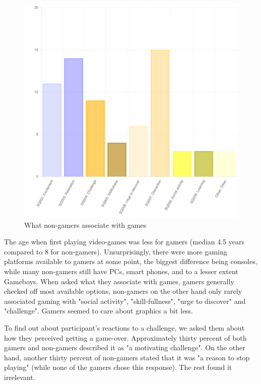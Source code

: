 \documentclass[]{vutinfth}
\begin{document}
\begin{figure}
\centering
\includegraphics{images/non-gamer-interests.png}
\caption{What non-gamers associate with games}
\end{figure}

The age when first playing video-games was less for gamers (median 4.5
years compared to 8 for non-gamers). Unsurprisingly, there were more
gaming platforms available to gamers at some point, the biggest
difference being consoles, while many non-gamers still have PCs, smart
phones, and to a lesser extent Gameboys. When asked what they associate
with games, gamers generally checked off most available options,
non-gamers on the other hand only rarely associated gaming with "social
activity", "skill-fullness", "urge to discover" and "challenge". Gamers
seemed to care about graphics a bit less.

To find out about participant's reactions to a challenge, we asked them
about how they perceived getting a game-over. Approximately thirty
percent of both gamers and non-gamers described it as "a motivating
challenge". On the other hand, another thirty percent of non-gamers
stated that it was "a reason to stop playing" (while none of the gamers
chose this response). The rest found it irrelevant.
\end{document}
